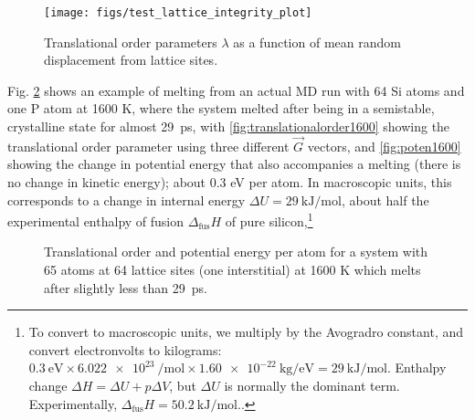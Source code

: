 \documentclass[11pt,bibliography=totoc,index=totoc]{scrbook}   %
\begin{document}
\begin{figure}[htbp]
  \begin{center}
    \texttt{[image: figs/test\_lattice\_integrity\_plot]}
  \end{center}
  \caption{Translational order parameters $\lambda$ as a function of mean random displacement from lattice sites.}
  \label{fig:tlotest}
\end{figure}

Fig. \ref{fig:melting1600} shows an example of melting from an actual MD run with 64 Si atoms and one P atom at 1600 K, where the system melted after being in a semistable, crystalline state for almost 29~ps,
with \ref{fig:translationalorder1600} showing the translational order parameter using three different $\vec{G}$ vectors,
and \ref{fig:poten1600} showing the change in potential energy that also accompanies a melting (there is no change in kinetic energy); about 0.3 eV per atom.
In macroscopic units, this corresponds to a change in internal energy $\Delta U = \SI{29}{\kilo\joule\per\mole}$, about half the experimental enthalpy of fusion $\Delta_{\text{fus}}H$ of pure silicon,\footnote{To convert to macroscopic units, we multiply by the Avogradro constant, and convert electronvolts to kilograms:
$\SI{0.3}{\electronvolt}\times\SI{6.022e23}{\per\mole}\times\SI{1.60e-22}{\kilogram\per\electronvolt} = \SI{29}{\kilo\joule\per\mole}$. 
Enthalpy change $\Delta H = \Delta U + p\Delta V$, but $\Delta U$ is normally the dominant term.
Experimentally, $\Delta_{\text{fus}} H = \SI{50.2}{\kilo\joule\per\mole}$.\cite[6.130]{CRC:85}.}
 


\begin{figure}[htbp]
  \centering
  \caption{Translational order and potential energy per atom for a system with 65 atoms at 64 lattice sites (one interstitial) at 1600 K which
  melts after slightly less than 29~ps.}
  \label{fig:melting1600}
\end{figure}
\end{document}
